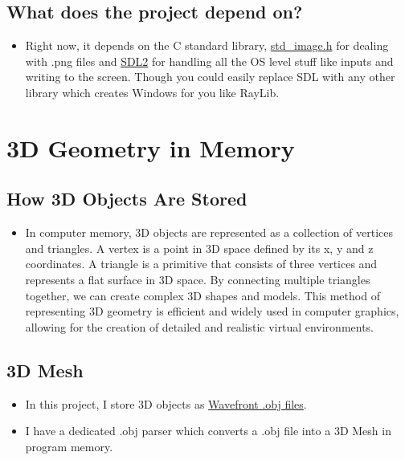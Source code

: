 \documentclass{article}
\begin{document}
\subsection{What does the project depend on?}
\begin{itemize}
\item Right now, it depends on the C standard library, \href{https://github.com/nothings/stb/blob/master/stb_image.h}{std\_image.h} for dealing with .png files and \href{https://www.libsdl.org/}{SDL2}  for handling all the OS level stuff like inputs and writing to the screen. Though you could easily replace SDL with any other library which creates Windows for you like RayLib.
\end{itemize}

\section{3D Geometry in Memory}

\subsection{How 3D Objects Are Stored}
\begin{itemize}
	\item In computer memory, 3D objects are represented as a collection of vertices and triangles. A vertex is a point in 3D space defined by its x, y and z coordinates. A triangle is a primitive that consists of three vertices and represents a flat surface in 3D space. By connecting multiple triangles together, we can create complex 3D shapes and models. This method of representing 3D geometry is efficient and widely used in computer graphics, allowing for the creation of detailed and realistic virtual environments.

\end{itemize}

\subsection{3D Mesh}
\begin{itemize}
	\item In this project, I store 3D objects as  \href{https://en.wikipedia.org/wiki/Wavefront_.obj_file}{Wavefront .obj files}.  
	\item I have a dedicated .obj parser which converts a .obj file into a 3D Mesh in program memory.
\end{itemize}
\end{document}
